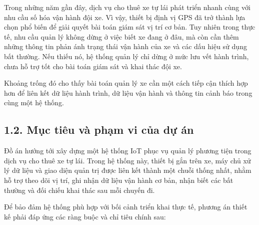 \documentclass[a4paper]{extarticle}
\begin{document}
Trong những năm gần đây, dịch vụ cho thuê xe tự lái phát triển nhanh cùng với nhu cầu số hóa vận hành đội xe. Vì vậy, thiết bị định vị GPS đã trở thành lựa chọn phổ biến để giải quyết bài toán giám sát vị trí cơ bản. Tuy nhiên trong thực tế, nhu cầu quản lý không dừng ở việc biết xe đang ở đâu, mà còn cần thêm những thông tin phản ánh trạng thái vận hành của xe và các dấu hiệu sử dụng bất thường. Nếu thiếu nó, hệ thống quản lý chỉ dừng ở mức lưu vết hành trình, chưa hỗ trợ tốt cho bài toán giám sát và khai thác đội xe.

Khoảng trống đó cho thấy bài toán quản lý xe cần một cách tiếp cận thích hợp hơn để liên kết dữ liệu hành trình, dữ liệu vận hành và thông tin cảnh báo trong cùng một hệ thống.

\subsection{1.2. Mục tiêu và phạm vi của dự án}\label{mux1ee5c-tiuxeau-vuxe0-phux1ea1m-vi-cux1ee7a-dux1ef1-uxe1n}

Đồ án hướng tới xây dựng một hệ thống IoT phục vụ quản lý phương tiện trong dịch vụ cho thuê xe tự lái. Trong hệ thống này, thiết bị gắn trên xe, máy chủ xử lý dữ liệu và giao diện quản trị được liên kết thành một chuỗi thống nhất, nhằm hỗ trợ theo dõi vị trí, ghi nhận dữ liệu vận hành cơ bản, nhận biết các bất thường và đối chiếu khai thác sau mỗi chuyến đi.

Để bảo đảm hệ thống phù hợp với bối cảnh triển khai thực tế, phương án thiết kế phải đáp ứng các ràng buộc và chỉ tiêu chính sau:
\end{document}
